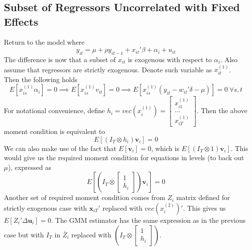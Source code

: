 \documentclass[12pt]{article}
\theoremstyle{definition}
\theoremstyle{property}
\theoremstyle{assumption}
\theoremstyle{example}
\theoremstyle{comment}
\begin{document}
\subsection{Subset of Regressors Uncorrelated with Fixed Effects}
Return to the model where
\[
y_{it}=\mu+\rho y_{it-1}+x_{it}'\beta+\alpha_i + u_{it}
\]
The difference is now that a subset of $x_{it}$ is exogenous with respect to  $\alpha_i$. Also assume that regressors are strictly exogenous. Denote such variable as $x_{it}^{(1)}$. Then the following holds
\[
E[x_{is}^{(1)}\alpha_i]=0\implies E[x_{is}^{(1)}v_{it}]=0\implies E[x_{is}^{(1)}(y_{it}-w_{it}'\delta-\mu)]=0 \ \forall s,t
\]
For notational convenience, define $h_i = vec(x_i^{(1)})=\begin{bmatrix} x_{i1}^{(1)} \\ ... \\ x_{iT}^{(1)}\end{bmatrix}$. Then the above moment condition is equivalent to
\[
E[(I_T\otimes h_i)\mathbf{v}_i]=0
\]
We can also make use of the fact that $E[\mathbf{v}_i]=0$, which is $E[(I_T\otimes 1)\mathbf{v}_i]$. This would give us the required moment condition for equations in levels (to back out $\mu$), expressed as
\[
E\left[\left(I_T\otimes \begin{bmatrix}1 \\h_i\end{bmatrix}\right)\mathbf{v}_i\right]=0
\]
Another set of required moment condition comes from $Z_i$ matrix defined for strictly exogenous case with $\mathbf{x}_{iT}'$ replaced with $vec(x_i^{(2)})'$. This gives us $E[Z_i'\Delta \mathbf{u}_i]=0$. The GMM estimator has the same expression as in the previous case but with $I_T$ in $\bar{Z}_i$ replaced with $\left(I_T\otimes \begin{bmatrix}1 \\h_i\end{bmatrix}\right)$.
\end{document}
